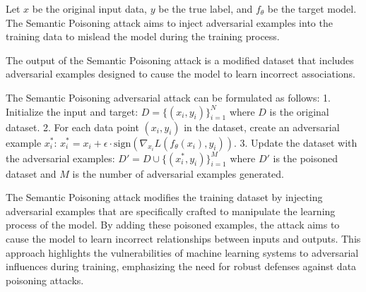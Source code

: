 Let \( x \) be the original input data, \( y \) be the true label, and \( f_{\theta} \) be the target model. The Semantic Poisoning attack aims to inject adversarial examples into the training data to mislead the model during the training process.

The output of the Semantic Poisoning attack is a modified dataset that includes adversarial examples designed to cause the model to learn incorrect associations.

The Semantic Poisoning adversarial attack can be formulated as follows:
1. Initialize the input and target:
   $
   D = \{(x_i, y_i)\}_{i=1}^N
   $
   where \( D \) is the original dataset.
2. For each data point \( (x_i, y_i) \) in the dataset, create an adversarial example \( x_i^* \):
   $
   x_i^* = x_i + \epsilon \cdot \text{sign}(\nabla_{x_i} L(f_{\theta}(x_i), y_i)).
   $
3. Update the dataset with the adversarial examples:
   $
   D' = D \cup \{(x_i^*, y_i)\}_{i=1}^M
   $
   where \( D' \) is the poisoned dataset and \( M \) is the number of adversarial examples generated.

The Semantic Poisoning attack modifies the training dataset by injecting adversarial examples that are specifically crafted to manipulate the learning process of the model. By adding these poisoned examples, the attack aims to cause the model to learn incorrect relationships between inputs and outputs. This approach highlights the vulnerabilities of machine learning systems to adversarial influences during training, emphasizing the need for robust defenses against data poisoning attacks.
